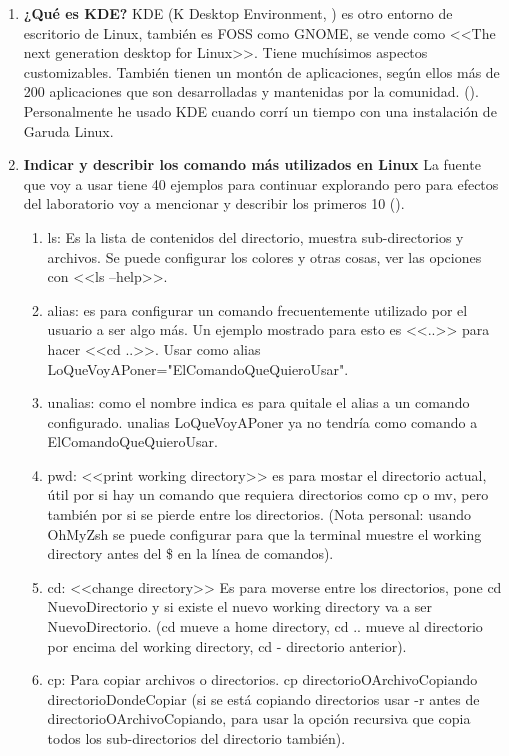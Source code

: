 \documentclass[stu, 12pt, letterpaper, donotrepeattitle, floatsintext, natbib, helv]{apa7}
\begin{document}
\begin{enumerate}
    \item \textbf{¿Qué es KDE?}
    KDE (K Desktop Environment, \cite{KDE1}) es otro entorno de escritorio de Linux, también es FOSS como GNOME, se vende como <<The next generation desktop for Linux>>. Tiene muchísimos aspectos customizables. También tienen un montón de aplicaciones, según ellos más de 200 aplicaciones que son desarrolladas y mantenidas por la comunidad. (\cite{KDE}). Personalmente he usado KDE cuando corrí un tiempo con una instalación de Garuda Linux.

    \item \textbf{Indicar y describir los comando más utilizados en Linux}
    La fuente que voy a usar tiene 40 ejemplos para continuar explorando pero para efectos del laboratorio voy a mencionar y describir los primeros 10 (\cite{commands}). 
    \begin{enumerate}
        \item ls: Es la lista de contenidos del directorio, muestra sub-directorios y archivos. Se puede configurar los colores y otras cosas, ver las opciones con <<ls --help>>.
        \item alias: es para configurar un comando frecuentemente utilizado por el usuario a ser algo más. Un ejemplo mostrado para esto es <<..>> para hacer <<cd ..>>. Usar como alias LoQueVoyAPoner="ElComandoQueQuieroUsar".
        \item unalias: como el nombre indica es para quitale el alias a un comando configurado. unalias LoQueVoyAPoner ya no tendría como comando a ElComandoQueQuieroUsar.
        \item pwd: <<print working directory>> es para mostar el directorio actual, útil por si hay un comando que requiera directorios como cp o mv, pero también por si se pierde entre los directorios. (Nota personal: usando OhMyZsh se puede configurar para que la terminal muestre el working directory antes del \$ en la línea de comandos).
        \item cd: <<change directory>> Es para moverse entre los directorios, pone cd NuevoDirectorio y si existe el nuevo working directory va a ser NuevoDirectorio. (cd mueve a home directory, cd .. mueve al directorio por encima del working directory, cd - directorio anterior).
        \item cp: Para copiar archivos o directorios. cp directorioOArchivoCopiando directorioDondeCopiar (si se está copiando directorios usar -r antes de directorioOArchivoCopiando, para usar la opción recursiva que copia todos los sub-directorios del directorio también).

\end{enumerate}
\end{enumerate}
\end{document}

